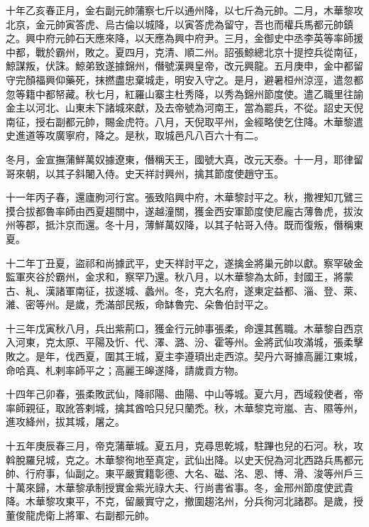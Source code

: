 \begin{pinyinscope}
 十年乙亥春正月，金右副元帥蒲察七斤以通州降，以七斤為元帥。二月，木華黎攻北京，金元帥寅答虎、烏古倫以城降，以寅答虎為留守，吾也而權兵馬都元帥鎮之。興中府元帥石天應來降，以天應為興中府尹。三月，金御史中丞李英等率師援中都，戰於霸州，敗之。夏四月，克清、順二州。詔張鯨總北京十提控兵從南征，鯨謀叛，伏誅。鯨弟致遂據錦州，僭號漢興皇帝，改元興龍。五月庚申，金中都留守完顏福興仰藥死，抹撚盡忠棄城走，明安入守之。是月，避暑桓州涼涇，遣忽都忽等籍中都帑藏。秋七月，紅羅山寨主杜秀降，以秀為錦州節度使。遣乙職里往諭金主以河北、山東未下諸城來獻，及去帝號為河南王，當為罷兵，不從。詔史天倪南征，授右副都元帥，賜金虎符。八月，天倪取平州，金經略使乞住降。木華黎遣史進道等攻廣寧府，降之。是秋，取城邑凡八百六十有二。



 冬月，金宣撫蒲鮮萬奴據遼東，僭稱天王，國號大真，改元天泰。十一月，耶律留哥來朝，以其子斜闍入侍。史天祥討興州，擒其節度使趙守玉。



 十一年丙子春，還廬朐河行宮。張致陷興中府，木華黎討平之。秋，撒裡知兀鷿三摸合拔都魯率師由西夏趨關中，遂越潼關，獲金西安軍節度使尼龐古薄魯虎，拔汝州等郡，抵汴京而還。冬十月，薄鮮萬奴降，以其子帖哥入侍。既而復叛，僭稱東夏。



 十二年丁丑夏，盜祁和尚據武平，史天祥討平之，遂擒金將巢元帥以獻。察罕破金監軍夾谷於霸州，金求和，察罕乃還。秋八月，以木華黎為太師，封國王，將蒙古、糺、漢諸軍南征，拔遂城、蠡州。冬，克大名府，遂東定益都、淄、登、萊、濰、密等州。是歲，禿滿部民叛，命缽魯完、朵魯伯討平之。



 十三年戊寅秋八月，兵出紫荊口，獲金行元帥事張柔，命還其舊職。木華黎自西京入河東，克太原、平陽及忻、代、澤、潞、汾、霍等州。金將武仙攻滿城，張柔擊敗之。是年，伐西夏，圍其王城，夏主李遵頊出走西涼。契丹六哥據高麗江東城，命哈真、札剌率師平之；高麗王皞遂降，請歲貢方物。



 十四年己卯春，張柔敗武仙，降祁陽、曲陽、中山等城。夏六月，西域殺使者，帝率師親征，取訛答剌城，擒其酋哈只兒只蘭禿。秋，木華黎克岢嵐、吉、隰等州，進攻絳州，拔其城，屠之。



 十五年庚辰春三月，帝克蒲華城。夏五月，克尋思乾城，駐蹕也兒的石河。秋，攻斡脫羅兒城，克之。木華黎徇地至真定，武仙出降。以史天倪為河北西路兵馬都元帥、行府事，仙副之。東平嚴實籍彰德、大名、磁、洺、恩、博、滑、浚等州戶三十萬來歸，木華黎承制授實金紫光祿大夫、行尚書省事。冬，金邢州節度使武貴降。木華黎攻東平，不克，留嚴實守之，撤圍趨洺州，分兵徇河北諸郡。是歲，授董俊龍虎衛上將軍、右副都元帥。




\end{pinyinscope}
